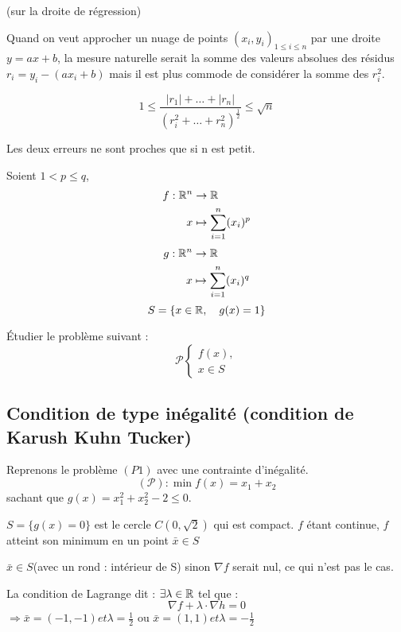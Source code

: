 \begin{remarque} (sur la droite de régression)

	Quand on veut approcher un nuage de points $(x_i, y_i)_{1 \leq i \leq n}$ par une droite $y = ax +b$, la mesure naturelle serait la somme des valeurs absolues des résidus $r_i = y_i -(ax_i+b)$ mais il est plus commode de considérer la somme des $r_i^2$.

	\[ 1 \leq \frac{ |r_1| + \dots + |r_n| }{ (r_i^2 + \dots + r_n^2)^{\frac{1}{2}} } \leq \sqrt{n} \]
	
	Les deux erreurs ne sont proches que si n est petit.
\end{remarque}

\begin{exemple}
	Soient $1 < p \leq q$,
	\begin{align*}
	f : \mathbb{R}^n & \rightarrow  \mathbb{R} \\
	x & \mapsto \sum_{i=1}^n (x_i)^p
	\end{align*}
	\begin{align*}
	g : \mathbb{R}^n & \rightarrow  \mathbb{R} \\
	x & \mapsto \sum_{i=1}^n (x_i)^q
	\end{align*}
	\[ S = \{ x \in \mathbb{R}, \quad g(x) = 1 \} \]
	
	Étudier le problème suivant :
	\[ \mathcal{P} \begin{cases} f(x), \\ x \in S \end{cases} \]
	
	
\end{exemple}

\subsection{Condition de type inégalité (condition de Karush Kuhn Tucker)}

\begin{exemple}
	Reprenons le problème $(P1)$ avec une contrainte d'inégalité.
	\[ (\mathcal{P}) : \min f(x) = x_1 + x_2 \]
	sachant que $g(x) = x_1^2+x_2^2 -2 \leq 0$.
	
	$S = \{ g(x) = 0 \}$ est le cercle $C(0, \sqrt{2})$ qui est compact. $f$ étant continue, $f$ atteint son minimum en un point $\bar{x} \in S$
	
	$\bar{x} \in S$(avec un rond : intérieur de S) sinon $\nabla f$ serait nul, ce qui n'est pas le cas.
	
	La condition de Lagrange dit : $\exists \lambda \in \mathbb{R}$ tel que : \[ \nabla f + \lambda \cdot \nabla h = 0 \]
	$\Rightarrow \bar{x} = (-1, -1) et \lambda = \frac{1}{2}$ ou $\bar{x} = (1, 1) et \lambda = -\frac{1}{2}$
	
\end{exemple}
	
